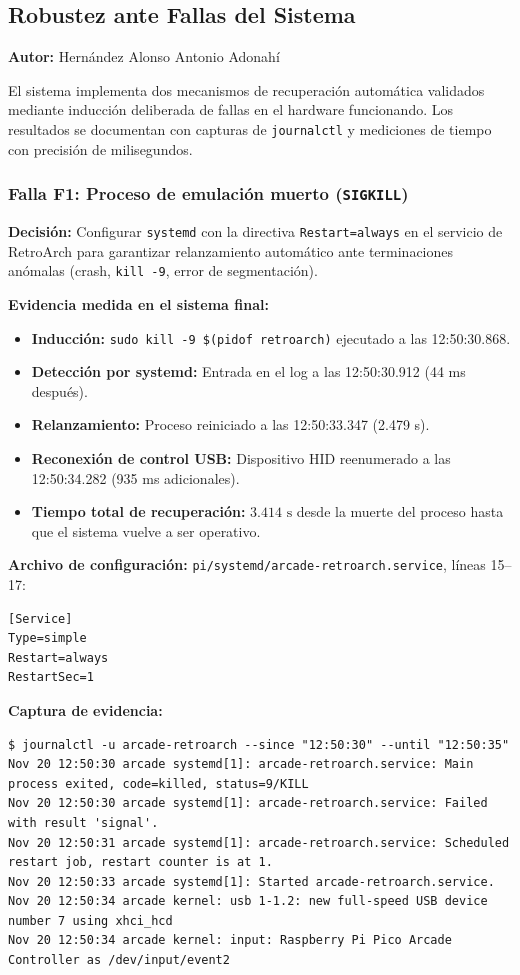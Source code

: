 \subsection{Robustez ante Fallas del Sistema}
\textbf{Autor:} Hernández Alonso Antonio Adonahí

El sistema implementa dos mecanismos de recuperación automática validados mediante inducción deliberada de fallas en el hardware funcionando. Los resultados se documentan con capturas de \texttt{journalctl} y mediciones de tiempo con precisión de milisegundos.

\subsubsection{Falla F1: Proceso de emulación muerto (\texttt{SIGKILL})}

\textbf{Decisión:} Configurar \texttt{systemd} con la directiva \texttt{Restart=always} en el servicio de RetroArch para garantizar relanzamiento automático ante terminaciones anómalas (crash, \texttt{kill -9}, error de segmentación).

\textbf{Evidencia medida en el sistema final:}
\begin{itemize}
	\item \textbf{Inducción:} \texttt{sudo kill -9 \$(pidof retroarch)} ejecutado a las 12:50:30.868.
	\item \textbf{Detección por systemd:} Entrada en el log a las 12:50:30.912 (44 ms después).
	\item \textbf{Relanzamiento:} Proceso reiniciado a las 12:50:33.347 (2.479 s).
	\item \textbf{Reconexión de control USB:} Dispositivo HID reenumerado a las 12:50:34.282 (935 ms adicionales).
	\item \textbf{Tiempo total de recuperación:} $3.414\text{ s}$ desde la muerte del proceso hasta que el sistema vuelve a ser operativo.
\end{itemize}

\textbf{Archivo de configuración:} \texttt{pi/systemd/arcade-retroarch.service}, líneas 15--17:
\begin{lstlisting}
[Service]
Type=simple
Restart=always
RestartSec=1
\end{lstlisting}

\textbf{Captura de evidencia:}
\begin{lstlisting}
$ journalctl -u arcade-retroarch --since "12:50:30" --until "12:50:35"
Nov 20 12:50:30 arcade systemd[1]: arcade-retroarch.service: Main process exited, code=killed, status=9/KILL
Nov 20 12:50:30 arcade systemd[1]: arcade-retroarch.service: Failed with result 'signal'.
Nov 20 12:50:31 arcade systemd[1]: arcade-retroarch.service: Scheduled restart job, restart counter is at 1.
Nov 20 12:50:33 arcade systemd[1]: Started arcade-retroarch.service.
Nov 20 12:50:34 arcade kernel: usb 1-1.2: new full-speed USB device number 7 using xhci_hcd
Nov 20 12:50:34 arcade kernel: input: Raspberry Pi Pico Arcade Controller as /dev/input/event2
\end{lstlisting}


